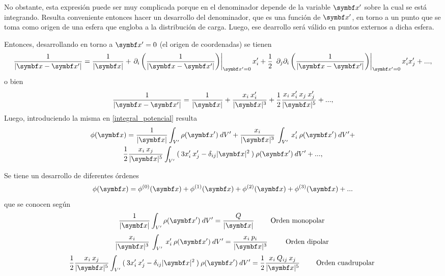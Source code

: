 \documentclass[10pt,oneside]{CBFT_book}
\begin{document}
No obstante, esta expresión puede ser muy complicada porque en el denominador depende de la variable 
$\vbx'$ sobre la cual se está integrando. 
Resulta conveniente entonces hacer un desarrollo del denominador, que es una función de $\vbx'$, en
torno a un punto que se toma como origen de una esfera que engloba a la distribución de carga.
Luego, ese dearrollo será válido en puntos externos a dicha esfera.


Entonces, desarrollando en torno a $\vbx'=0$ (el origen de coordenadas) se tienen
\[
	\frac{ 1 }{| \vbx -\vbx' | } = 
	\frac{ 1 }{| \vbx |} + \left.\partial_i \left( \frac{ 1 }{| \vbx -\vbx' | } \right)\right|_{\vbx'=0} x_i' +
	\frac{1}{2} \: \left. \partial_j \partial_i \left( \frac{ 1 }{| \vbx -\vbx' | } \right)\right|_{\vbx'=0} x_i' x_j' + ...,
\]
o bien 
\[
	\frac{ 1 }{| \vbx -\vbx' | } = 
	\frac{ 1 }{| \vbx |} + \frac{x_i \: x_i'}{| \vbx |^3} +
	\frac{1}{2} \frac{ x_i \: x_i' \: x_j \: x_j' }{ | \vbx |^5 } + ...,	
\]
Luego, introduciendo la misma en \eqref{integral_potencial} resulta
\begin{multline*}
 	\phi(\vb{x}) =
	\frac{ 1 }{| \vbx |} \int_{V'} \rho( \vbx' ) \: dV' + 
	\frac{x_i }{| \vbx |^3} \: \int_{V'} \: x_i' \: \rho( \vbx' ) \: dV' + \\
	\frac{1}{2} \frac{ x_i  \: x_j  }{ | \vbx |^5 } 
	\int_{V'} \: (\: 3 x_i' \: x_j' - \delta_{ij}|\vbx|^2 \:) \: \rho( \vbx' ) \: dV' + ...,
\end{multline*}

Se tiene un desarrollo de diferentes órdenes 
\[
	\phi(\vb{x}) = \phi^{(0)}(\vbx) + \phi^{(1)}(\vbx) + \phi^{(2)}(\vbx) + \phi^{(3)}(\vbx) + ...
\]
que se conocen según
\[
	\frac{ 1 }{| \vbx |} \int_{V'} \rho( \vbx' ) \: dV' = \frac{ Q }{| \vbx |} \qquad \text{ Orden monopolar }
\]
\[
	\frac{x_i }{| \vbx |^3} \: \int_{V'} \: x_i' \: \rho( \vbx' ) \: dV' = 
	\frac{x_i \: p_i }{| \vbx |^3} \: \qquad \text{ Orden dipolar }
\]
\[
	\frac{1}{2} \frac{ x_i  \: x_j  }{ | \vbx |^5 } 
	\int_{V'} \: (\: 3 x_i' \: x_j' - \delta_{ij}|\vbx|^2 \:) \: \rho( \vbx' ) \: dV' =
	\frac{1}{2} \frac{ x_i  \: Q_{ij} \: x_j  }{ | \vbx |^5 } \qquad \text{ Orden cuadrupolar }
\]
\end{document}

